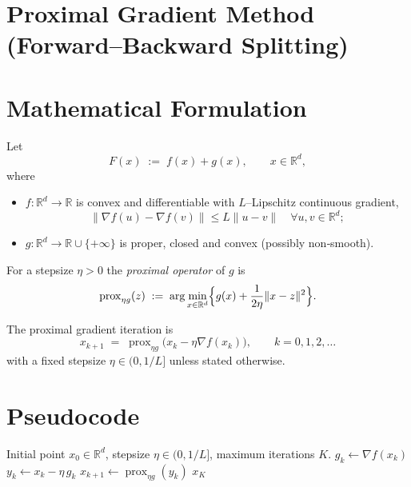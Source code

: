 \documentclass{article}
\begin{document}
\section*{Proximal Gradient Method (Forward–Backward Splitting)}

\section*{Mathematical Formulation}
Let 
\[
F(x)\;:=\;f(x)+g(x),\qquad x\in\mathbb{R}^{d},
\]
where  

\begin{itemize}[nosep]
\item $f:\mathbb{R}^{d}\to\mathbb{R}$ is convex and differentiable with $L$–Lipschitz continuous gradient,
      \[
      \|\nabla f(u)-\nabla f(v)\|\le L\|u-v\|\quad\forall u,v\in\mathbb{R}^{d};
      \]
\item $g:\mathbb{R}^{d}\to\mathbb{R}\cup\{+\infty\}$ is proper, closed and convex (possibly non‑smooth).
\end{itemize}
For a stepsize $\eta>0$ the \emph{proximal operator} of $g$ is
\[
\operatorname{prox}_{\eta g}(z)\;:=\;\arg\min_{x\in\mathbb{R}^{d}}\Bigl\{ g(x)+\frac{1}{2\eta}\|x-z\|^{2}\Bigr\}.
\]

The proximal gradient iteration is
\begin{equation}\label{eq:pg}
x_{k+1}\;=\;\operatorname{prox}_{\eta g}\!\bigl(x_{k}-\eta\nabla f(x_{k})\bigr),\qquad k=0,1,2,\dots
\end{equation}
with a fixed stepsize $\eta\in(0,1/L]$ unless stated otherwise.

\section*{Pseudocode}
\begin{algorithm}[H]
\caption{Proximal Gradient Method}
\begin{algorithmic}[1]
\Require Initial point $x_{0}\in\mathbb{R}^{d}$, stepsize $\eta\in(0,1/L]$, maximum iterations $K$.
    \State $g_{k}\gets \nabla f(x_{k})$                         
    \State $y_{k}\gets x_{k}-\eta\,g_{k}$                       
    \State $x_{k+1}\gets \operatorname{prox}_{\eta g}(y_{k})$    
\EndFor
\State \Return $x_{K}$
\end{algorithmic}
\end{algorithm}
\end{document}
